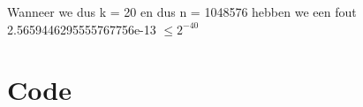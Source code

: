 \documentclass{article}
\begin{document}
\begin{flushleft}
Wanneer we dus k = 20 en dus n = 1048576 hebben we een fout 2.5659446295555767756e-13  $\leq 2^{-40}$
\section{Code}



\end{flushleft}
\end{document}
